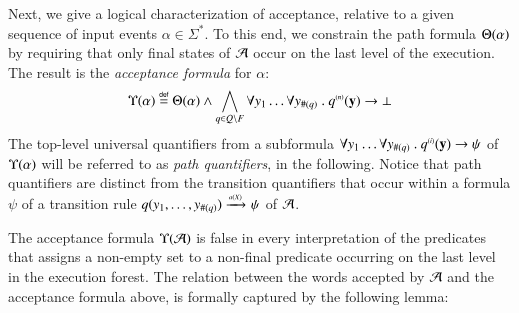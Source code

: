 \documentclass{llncs}
\begin{document}
Next, we give a logical characterization of acceptance, relative to a
given sequence of input events $\alpha \in \Sigma^*$. To this end, we
constrain the path formula $\Theta({\alpha})$ by requiring that only
final states of $\mathcal{A}$ occur on the last level of the execution.  The
result is the \emph{acceptance formula} for $\alpha$:
\begin{equation}\label{eq:accform}
\Upsilon({\alpha}) \stackrel{\scriptscriptstyle{\mathsf{def}}}{=} \Theta({\alpha}) \wedge \bigwedge_{q
  \in Q \setminus F} \forall y_1 \ldots \forall y_{\#(q)} ~.~
{q}^{\scriptscriptstyle{({n})}}(\mathbf y) \rightarrow \bot
\end{equation}
The top-level universal quantifiers from a subformula $\forall y_1
\ldots \forall y_{\#(q)} ~.~ {q}^{\scriptscriptstyle{({i})}}(\mathbf y) \rightarrow \psi$
of $\Upsilon({\alpha})$ will be referred to as \emph{path quantifiers},
in the following. Notice that path quantifiers are distinct from the
transition quantifiers that occur within a formula $\psi$ of a
transition rule $q(y_1,\ldots,y_{\#(q)}) \xrightarrow{{\scriptscriptstyle a(X)}}_{{\scriptstyle }} \psi$ of $\mathcal{A}$.

The acceptance formula $\Upsilon({\mathcal{A}})$ is false in every interpretation
of the predicates that assigns a non-empty set to a non-final
predicate occurring on the last level in the execution forest. The
relation between the words accepted by $\mathcal{A}$ and the acceptance formula
above, is formally captured by the following lemma:
\end{document}
